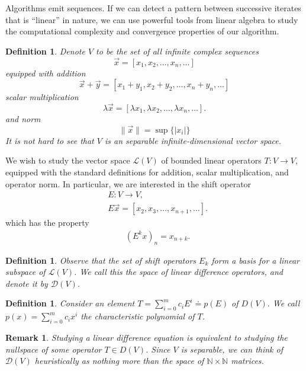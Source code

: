 \documentclass[12pt,reqno]{amsart}
\numberwithin{equation}{section}  %
\newtheorem{definition}[theorem]{Definition}
\newtheorem{remark}[theorem]{Remark}
\begin{document}
Algorithms emit sequences. If we can detect a pattern between successive
iterates that is ``linear'' in nature, we can use powerful tools from linear
algebra to study the computational complexity and convergence properties of our
algorithm.
\begin{definition}
Denote $V$ to be the set of all infinite complex sequences
\begin{equation*}
\vec{x} = [x_1, x_2, \ldots, x_n, \ldots]
\end{equation*}
equipped with addition
\begin{equation*}
\vec{x} + \vec{y} = [x_1 + y_1, x_2 + y_2, \ldots, x_n + y_n, \ldots]	
\end{equation*}
scalar multiplication
\begin{equation*}
\lambda \vec{x} = [\lambda x_1, \lambda x_2, \ldots, \lambda x_n, \ldots].
\end{equation*}
and norm
\begin{equation*}
\| \vec{x} \| = \sup \{|x_i| \}
\end{equation*}
It is not hard to see that $V$ is an separable infinite-dimensional vector
space.
\end{definition}
We wish to study the vector space $\mathcal{L}(V)$ of bounded linear operators
$T:
V \to V$, equipped with the standard definitions for addition, scalar
multiplication, and operator norm.
In particular, we are interested in the shift operator
\begin{align*}
& E: V \to V,
\\
& E \vec{x} = [x_2, x_3, \ldots, x_{n+1}, \ldots].
\end{align*}
which has the property 
\begin{align*}
& (E^k x)_{n} = x_{n+k}.
\end{align*}
\begin{definition}
Observe that the set of shift operators ${E_k}$ form a basis for a
linear subspace of $\mathcal{L}(V)$. We call this the space of
\emph{linear difference operators}, and denote it by $\mathcal{D}(V)$.
\end{definition}
\begin{definition}
Consider an element $T = \sum_{i=0}^{m}c_i E^i \doteq p(E)$ of $D(V).$ We call
$p(x) = \sum_{i=0}^{m} c_i x^i$ the \emph{characteristic polynomial} of $T$.
\end{definition}
\begin{remark}
Studying a linear difference equation is equivalent to studying the nullspace
of some operator $T \in D(V)$. Since $V$ is separable, we can think of
$\mathcal{D}(V)$ heuristically as nothing more than the space of $\mathbb{N}
\times \mathbb{N}$ matrices. 
\end{remark}
\end{document}
